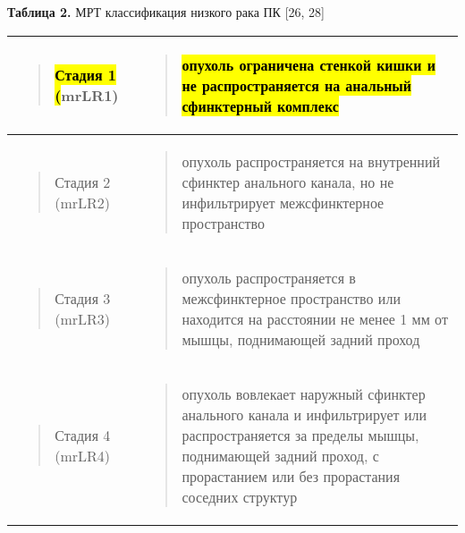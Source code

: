 \documentclass[
  russian,
  12pt,
  a4paper,
]{report}
\begin{document}
\textbf{Таблица 2.} МРТ классификация низкого рака ПК {[}26, 28{]}

\begin{longtable}[]{@{}
  >{\raggedright\arraybackslash}p{}
  >{\raggedright\arraybackslash}p{}@{}}
\toprule\noalign{}
\begin{minipage}[b]{\linewidth}\raggedright
\begin{quote}
\hl{Стадия 1 (}mrLR1)
\end{quote}
\end{minipage} & \begin{minipage}[b]{\linewidth}\raggedright
\begin{quote}
\hl{опухоль ограничена стенкой кишки и не распространяется на анальный
сфинктерный комплекс}
\end{quote}
\end{minipage} \\
\midrule\noalign{}
\endhead
\bottomrule\noalign{}
\endlastfoot
\begin{minipage}[t]{\linewidth}\raggedright
\begin{quote}
Стадия 2 (mrLR2)
\end{quote}
\end{minipage} & \begin{minipage}[t]{\linewidth}\raggedright
\begin{quote}
опухоль распространяется на внутренний сфинктер анального канала, но не
инфильтрирует межсфинктерное пространство
\end{quote}
\end{minipage} \\
\begin{minipage}[t]{\linewidth}\raggedright
\begin{quote}
Стадия 3 (mrLR3)
\end{quote}
\end{minipage} & \begin{minipage}[t]{\linewidth}\raggedright
\begin{quote}
опухоль распространяется в межсфинктерное пространство или находится на
расстоянии не менее 1 мм от мышцы, поднимающей задний проход
\end{quote}
\end{minipage} \\
\begin{minipage}[t]{\linewidth}\raggedright
\begin{quote}
Стадия 4 (mrLR4)
\end{quote}
\end{minipage} & \begin{minipage}[t]{\linewidth}\raggedright
\begin{quote}
опухоль вовлекает наружный сфинктер анального канала и инфильтрирует или
распространяется за пределы мышцы, поднимающей задний проход, с
прорастанием или без прорастания соседних структур
\end{quote}
\end{minipage} \\
\end{longtable}
\end{document}

